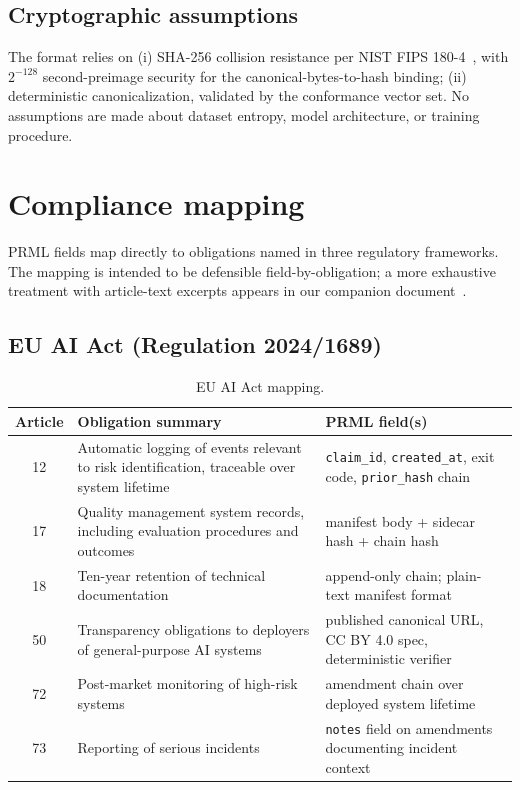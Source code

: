 \documentclass[11pt, a4paper]{article}
\begin{document}
\subsection{Cryptographic assumptions}

The format relies on (i) SHA-256 collision resistance per NIST FIPS 180-4~\cite{nist2015fips180}, with $2^{-128}$ second-preimage security for the canonical-bytes-to-hash binding; (ii) deterministic canonicalization, validated by the conformance vector set. No assumptions are made about dataset entropy, model architecture, or training procedure.

\section{Compliance mapping}
\label{sec:compliance}

PRML fields map directly to obligations named in three regulatory frameworks. The mapping is intended to be defensible field-by-obligation; a more exhaustive treatment with article-text excerpts appears in our companion document~\cite{prml2026compliance}.

\subsection{EU AI Act (Regulation 2024/1689)}

\begin{table}[h]
\centering
\small
\begin{tabular}{@{}c p{6cm} p{6cm}@{}}
\toprule
Article & Obligation summary & PRML field(s) \\
\midrule
12 & Automatic logging of events relevant to risk identification, traceable over system lifetime & \texttt{claim\_id}, \texttt{created\_at}, exit code, \texttt{prior\_hash} chain \\
17 & Quality management system records, including evaluation procedures and outcomes & manifest body + sidecar hash + chain hash \\
18 & Ten-year retention of technical documentation & append-only chain; plain-text manifest format \\
50 & Transparency obligations to deployers of general-purpose AI systems & published canonical URL, CC BY 4.0 spec, deterministic verifier \\
72 & Post-market monitoring of high-risk systems & amendment chain over deployed system lifetime \\
73 & Reporting of serious incidents & \texttt{notes} field on amendments documenting incident context \\
\bottomrule
\end{tabular}
\caption{EU AI Act mapping.}
\label{tab:aiact}
\end{table}
\end{document}
